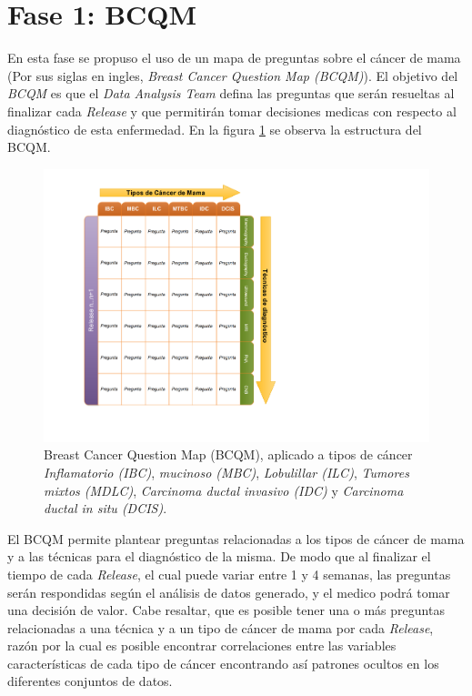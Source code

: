 \section{Fase 1: BCQM} 
En esta fase se propuso el uso de un mapa de preguntas sobre el cáncer de mama (Por sus siglas en ingles, \textit{Breast Cancer Question Map (BCQM)}). El objetivo del \textit{BCQM} es que el \textit{Data Analysis Team} defina las preguntas que serán resueltas al finalizar cada \textit{Release} y que permitirán tomar decisiones medicas con respecto al diagnóstico de esta enfermedad. En la figura \ref{BCQM} se observa la estructura del BCQM.

\begin{figure}
	\centering
	\includegraphics[width=0.8
	\linewidth]{IMAGENES/BCQM_SPANISH}
	\caption{Breast Cancer Question Map (BCQM), aplicado a tipos de cáncer \textit{Inflamatorio (IBC)}, \textit{mucinoso (MBC)}, \textit{Lobulillar (ILC)}, \textit{Tumores mixtos (MDLC)}, \textit{Carcinoma ductal invasivo (IDC)} y \textit{Carcinoma ductal in situ (DCIS)}\cite{BCQM2023}.}
	\label{BCQM}
\end{figure}

El BCQM permite plantear preguntas relacionadas a los tipos de cáncer de mama y a las técnicas para el diagnóstico de la misma. De modo que al finalizar el tiempo de cada \textit{Release}, el cual puede variar entre 1 y 4 semanas, las preguntas serán respondidas según el análisis de datos generado, y el medico podrá tomar una decisión de valor. Cabe resaltar, que es posible tener una o más preguntas relacionadas a una técnica y a un tipo de cáncer de mama por cada \textit{Release}, razón por la cual es posible encontrar correlaciones entre las variables características de cada tipo de cáncer encontrando así patrones ocultos en los diferentes conjuntos de datos.

